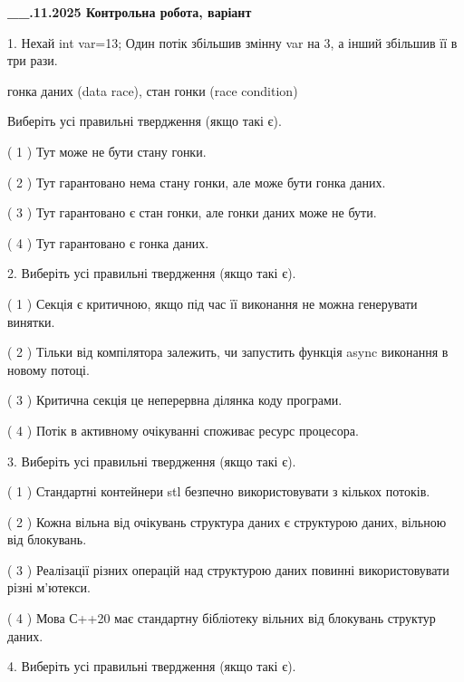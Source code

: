 \documentclass[12pt, ukrainian]{article}
\begin{document}
\newpage
\begin {large}

\textbf{\_\_.11.2025 Контрольна робота, варіант  }\par


{
1. Нехай int var=13; Один потік збільшив змінну var на 3, а інший збільшив її в три рази.

гонка даних (data race), стан гонки (race condition)

Виберіть усі правильні твердження (якщо такі є).\par
\vspace{2mm}
( 1 ) Тут може не бути стану гонки.%

( 2 ) Тут гарантовано нема стану гонки, але може бути гонка даних.%

( 3 ) Тут гарантовано є стан гонки, але гонки даних може не бути.%

( 4 ) Тут гарантовано є гонка даних.%


2. Виберіть усі правильні твердження (якщо такі є).\par
\vspace{2mm}

( 1 ) Секція є критичною, якщо під час її виконання не можна генерувати винятки.%

( 2 ) Тільки від компілятора залежить, чи запустить функція async виконання в новому потоці.%

( 3 ) Критична секція це неперервна ділянка коду програми.%

( 4 ) Потік в активному очікуванні споживає ресурс процесора.%


3. Виберіть усі правильні твердження (якщо такі є).\par
\vspace{2mm}

( 1 ) Стандартні контейнери stl безпечно використовувати з кількох потоків.%

( 2 ) Кожна вільна від очікувань структура даних є структурою даних, вільною від блокувань.%

( 3 ) Реалізації різних операцій над структурою даних повинні використовувати різні м’ютекси.%

( 4 ) Мова С++20 має стандартну бібліотеку вільних від блокувань структур даних.%


4. Виберіть усі правильні твердження (якщо такі є).\par
\vspace{2mm}

}
\end{large}
\end{document}
